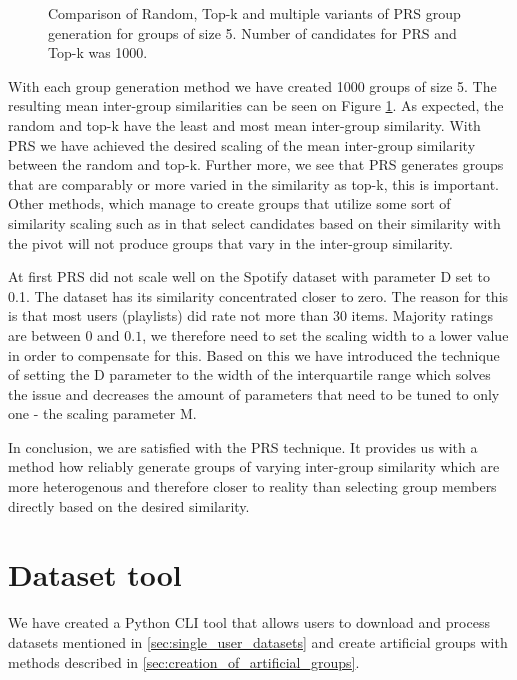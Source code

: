 \begin{figure}[ht!]
    \caption[Comparison of Random, Top-k and multiple variants of PRS group generation of size 5.]{Comparison of Random, Top-k and multiple variants of PRS group generation for groups of size 5. Number of candidates for PRS and Top-k was 1000.}
    \label{fig:inter_group_means}
\end{figure}

With each group generation method we have created 1000 groups of size 5. The resulting mean inter-group similarities can be seen on Figure \ref{fig:inter_group_means}. As expected, the random and top-k have the least and most mean inter-group similarity. With PRS we have achieved the desired scaling of the mean inter-group similarity between the random and top-k. Further more, we see that PRS generates groups that are comparably or more varied in the similarity as top-k, this is important. Other methods, which manage to create groups that utilize some sort of similarity scaling such as in \cite{GFAR-kaya2020} that select candidates based on their similarity with the pivot will not produce groups that vary in the inter-group similarity.

At first PRS did not scale well on the Spotify dataset with parameter D set to 0.1. The dataset has its similarity concentrated closer to zero. The reason for this is that most users (playlists) did rate not more than 30 items. Majority ratings are between $0$ and $0.1$, we therefore need to set the scaling width to a lower value in order to compensate for this. Based on this we have introduced the technique of setting the D parameter to the width of the interquartile range which solves the issue and decreases the amount of parameters that need to be tuned to only one - the scaling parameter M. 

In conclusion, we are satisfied with the PRS technique. It provides us with a method how reliably generate groups of varying inter-group similarity which are more heterogenous and therefore closer to reality than selecting group members directly based on the desired similarity.

\section{Dataset tool} \label{sec:dataset_tool}

We have created a Python CLI tool that allows users to download and process datasets mentioned in \ref{sec:single_user_datasets} and create artificial groups with methods described in \ref{sec:creation_of_artificial_groups}.


